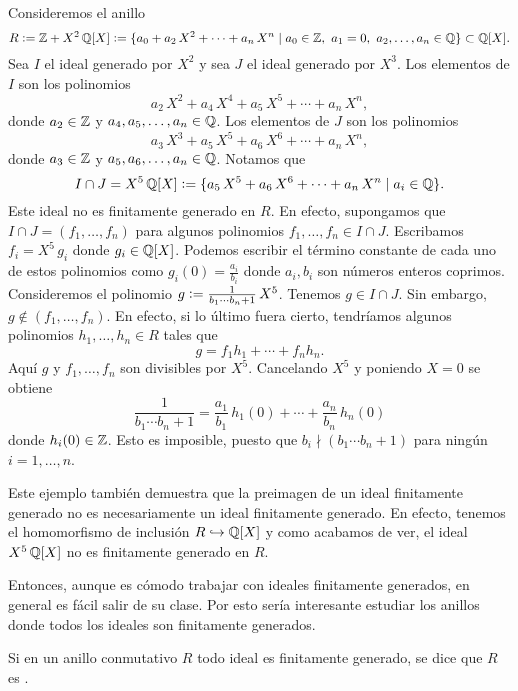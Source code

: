 \begin{ejemplo}
  Consideremos el anillo
  \[ R \mathrel{\mathop:}= \mathbb{Z} + X^2\,\mathbb{Q} [X] \mathrel{\mathop:}=
     \{ a_0 + a_2\,X^2 + \cdots + a_n\,X^n \mid
     a_0\in\mathbb{Z}, ~ a_1 = 0, ~ a_2,\ldots,a_n \in \mathbb{Q} \} \subset \mathbb{Q} [X]. \]
  Sea $I$ el ideal generado por $X^2$ y sea $J$ el ideal generado por $X^3$.
  Los elementos de $I$ son los polinomios
  $$a_2\,X^2 + a_4\,X^4 + a_5\,X^5 + \cdots + a_n\,X^n,$$
  donde $a_2 \in \mathbb{Z}$ y $a_4, a_5, \ldots, a_n \in \mathbb{Q}$. Los elementos de $J$
  son los polinomios
  $$a_3\,X^3 + a_5\,X^5 + a_6\,X^6 + \cdots + a_n\,X^n,$$
  donde $a_3 \in \mathbb{Z}$ y $a_5,a_6,\ldots,a_n \in \mathbb{Q}$. Notamos que
  \[ I \cap J = X^5\,\mathbb{Q} [X] \mathrel{\mathop:}=
     \{ a_5\,X^5 + a_6\,X^6 + \cdots + a_n\,X^n \mid a_i \in \mathbb{Q} \}. \]
  Este ideal no es finitamente generado en $R$. En efecto, supongamos que
  $I\cap J = (f_1,\ldots,f_n)$ para algunos polinomios
  $f_1,\ldots,f_n \in I\cap J$. Escribamos $f_i = X^5\,g_i$ donde
  $g_i \in \mathbb{Q} [X]$. Podemos escribir el término constante de cada uno de estos
  polinomios como $g_i (0) = \frac{a_i}{b_i}$ donde $a_i, b_i$ son números
  enteros coprimos. Consideremos el polinomio
  $g \mathrel{\mathop:}= \frac{1}{b_1\cdots b_n + 1}\,X^5$. Tenemos $g\in I\cap J$. Sin
  embargo, $g\notin (f_1,\ldots,f_n)$. En efecto, si lo último fuera cierto,
  tendríamos algunos polinomios $h_1,\ldots,h_n \in R$ tales que
  $$g = f_1 h_1 + \cdots + f_n h_n.$$
  Aquí $g$ y $f_1,\ldots,f_n$ son divisibles por $X^5$. Cancelando $X^5$ y
  poniendo $X = 0$ se obtiene
  \[ \frac{1}{b_1\cdots b_n + 1} =
     \frac{a_1}{b_1}\,h_1 (0) + \cdots + \frac{a_n}{b_n}\,h_n (0) \]
  donde $h_i (0) \in \mathbb{Z}$. Esto es imposible, puesto que
  $b_i \nmid (b_1\cdots b_n + 1)$ para ningún $i = 1,\ldots,n$.

  Este ejemplo también demuestra que la preimagen de un ideal finitamente
  generado no es necesariamente un ideal finitamente generado. En efecto,
  tenemos el homomorfismo de inclusión $R \hookrightarrow \mathbb{Q} [X]$ y como
  acabamos de ver, el ideal $X^5\,\mathbb{Q} [X]$ no es finitamente generado en $R$.
\end{ejemplo}

Entonces, aunque es cómodo trabajar con ideales finitamente generados, en
general es fácil salir de su clase. Por esto sería interesante estudiar los
anillos donde todos los ideales son finitamente generados.

\begin{definicion}
  Si en un anillo conmutativo $R$ todo ideal es finitamente generado, se dice
  que $R$ es .
\end{definicion}


